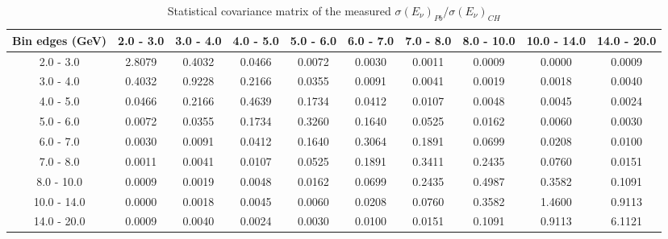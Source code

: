 \documentclass[aps,prl,twocolumn,superscriptaddress,nofootinbib]{revtex4-1}
\begin{document}
\begin{table}[h!]
  \centering
  \caption{Statistical covariance matrix of the measured $\sigma(E_{\nu})_{Pb}/\sigma(E_{\nu})_{CH}$}
    \begin{tabular}{c||ccccccccc}
      Bin edges (GeV) & 2.0 - 3.0 & 3.0 - 4.0 & 4.0 - 5.0 & 5.0 - 6.0 & 6.0 - 7.0 & 7.0 - 8.0 & 8.0 - 10.0 & 10.0 - 14.0 & 14.0 - 20.0 \\
\hline \hline
        2.0 - 3.0 &  2.8079 &  0.4032 &  0.0466 &  0.0072 &  0.0030 &  0.0011 &  0.0009 &  0.0000 &  0.0009 \\
        3.0 - 4.0 &  0.4032 &  0.9228 &  0.2166 &  0.0355 &  0.0091 &  0.0041 &  0.0019 &  0.0018 &  0.0040 \\
        4.0 - 5.0 &  0.0466 &  0.2166 &  0.4639 &  0.1734 &  0.0412 &  0.0107 &  0.0048 &  0.0045 &  0.0024 \\
        5.0 - 6.0 &  0.0072 &  0.0355 &  0.1734 &  0.3260 &  0.1640 &  0.0525 &  0.0162 &  0.0060 &  0.0030 \\
        6.0 - 7.0 &  0.0030 &  0.0091 &  0.0412 &  0.1640 &  0.3064 &  0.1891 &  0.0699 &  0.0208 &  0.0100 \\
        7.0 - 8.0 &  0.0011 &  0.0041 &  0.0107 &  0.0525 &  0.1891 &  0.3411 &  0.2435 &  0.0760 &  0.0151 \\
       8.0 - 10.0 &  0.0009 &  0.0019 &  0.0048 &  0.0162 &  0.0699 &  0.2435 &  0.4987 &  0.3582 &  0.1091 \\
      10.0 - 14.0 &  0.0000 &  0.0018 &  0.0045 &  0.0060 &  0.0208 &  0.0760 &  0.3582 &  1.4600 &  0.9113 \\
      14.0 - 20.0 &  0.0009 &  0.0040 &  0.0024 &  0.0030 &  0.0100 &  0.0151 &  0.1091 &  0.9113 &  6.1121 \\
    \end{tabular}
  \label{tablecov:Pb_Statistical_Enu}
\end{table}
\end{document}
